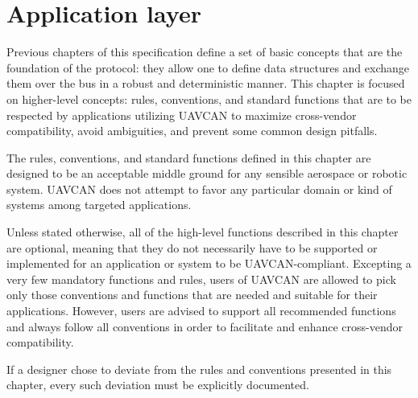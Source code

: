 \chapter{Application layer}\label{sec:application_layer}

Previous chapters of this specification define a set of basic concepts that are the foundation of the protocol:
they allow one to define data structures and exchange them over the bus in a robust and deterministic manner.
This chapter is focused on higher-level concepts: rules, conventions, and standard functions that are to be
respected by applications utilizing UAVCAN to maximize cross-vendor compatibility, avoid ambiguities, and
prevent some common design pitfalls.

The rules, conventions, and standard functions defined in this chapter are designed to be an acceptable middle
ground for any sensible aerospace or robotic system.
UAVCAN does not attempt to favor any particular domain or kind of systems among targeted applications.

Unless stated otherwise, all of the high-level functions described in this chapter are optional,
meaning that they do not necessarily have to be supported or implemented for an application or system to be
UAVCAN-compliant.
Excepting a very few mandatory functions and rules, users of UAVCAN are allowed to pick only those conventions
and functions that are needed and suitable for their applications.
However, users are advised to support all recommended functions and always follow all conventions
in order to facilitate and enhance cross-vendor compatibility.

If a designer chose to deviate from the rules and conventions presented in this chapter,
every such deviation must be explicitly documented.

\clearpage
\clearpage
